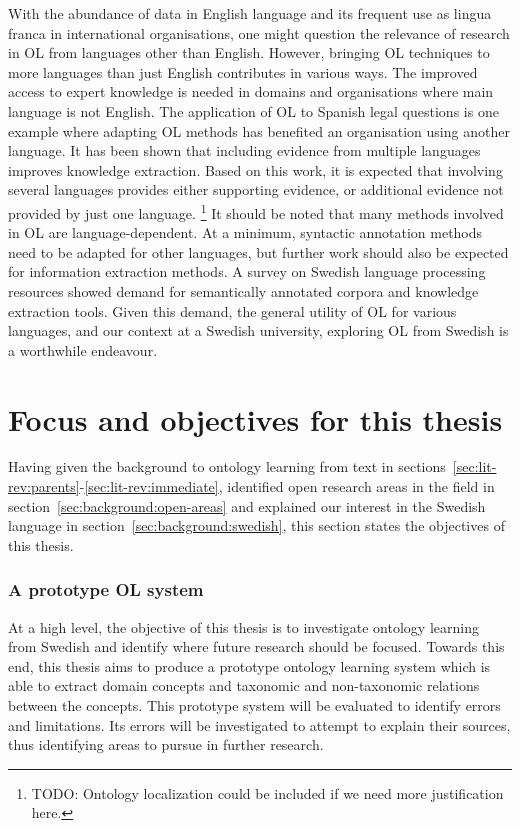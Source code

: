 \documentclass[a4paper]{report}
\newcommand{\todo}[1]{\footnote{{\color{red} TODO: #1}}}
\begin{document}
With the abundance of data in English language and its frequent use as lingua franca in international organisations, one might question the relevance of research in OL from languages other than English.
However, bringing OL techniques to more languages than just English contributes in various ways.
The improved access to expert knowledge is needed in domains and organisations where main language is not English.
The application of OL to Spanish legal questions is one example where adapting OL methods has benefited an organisation using another language\cite{Voelkner2008Spanish}.
It has been shown that including evidence from multiple languages improves knowledge extraction\cite{Hjelm09Thesis}.
Based on this work, it is expected that involving several languages provides either supporting evidence, or additional evidence not provided by just one language\cite{Hjelm09Thesis}.
\todo{Ontology localization could be included if we need more justification here.}
It should be noted that many methods involved in OL are language-dependent.
At a minimum, syntactic annotation methods need to be adapted for other languages, but further work should also be expected for information extraction methods.
A survey on Swedish language processing resources showed demand for semantically annotated corpora and knowledge extraction tools\cite{EleniusEtAl08SwedTools}.
Given this demand, the general utility of OL for various languages, and our context at a Swedish university, exploring OL from Swedish is a worthwhile endeavour.

\section{Focus and objectives for this thesis}
\label{sec:background:objectives}

Having given the background to ontology learning from text in sections~\ref{sec:lit-rev:parents}-\ref{sec:lit-rev:immediate}, identified open research areas in the field in section~\ref{sec:background:open-areas} and explained our interest in the Swedish language in section~\ref{sec:background:swedish}, this section states the objectives of this thesis.

\subsubsection{A prototype OL system}

At a high level, the objective of this thesis is to investigate ontology learning from Swedish and identify where future research should be focused.
Towards this end, this thesis aims to produce a prototype ontology learning system which is able to extract domain concepts and taxonomic and non-taxonomic relations between the concepts.
This prototype system will be evaluated to identify errors and limitations.
Its errors will be investigated to attempt to explain their sources, thus identifying areas to pursue in further research.
\end{document}
